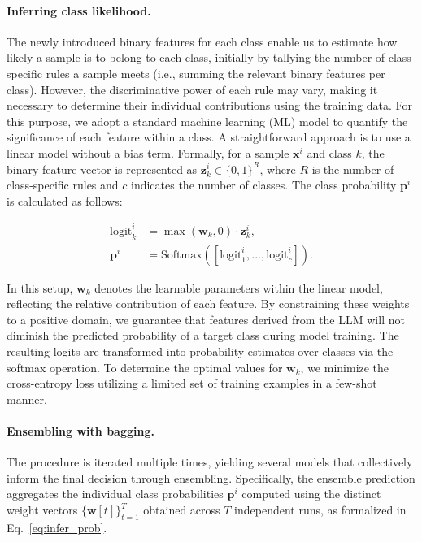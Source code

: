 \paragraph{Inferring class likelihood.} The newly introduced binary features for each class enable us to estimate how likely a sample is to belong to each class, initially by tallying the number of class-specific rules a sample meets (i.e., summing the relevant binary features per class). However, the discriminative power of each rule may vary, making it necessary to determine their individual contributions using the training data. For this purpose, we adopt a standard machine learning (ML) model to quantify the significance of each feature within a class. A straightforward approach is to use a linear model without a bias term. Formally, for a sample $\mathbf{x}^i$ and class $k$, the binary feature vector is represented as $\mathbf{z}_k^i \in \{0, 1\}^R$, where $R$ is the number of class-specific rules and $c$ indicates the number of classes. The class probability $\mathbf{p}^i$ is calculated as follows:

\begin{align}
\text{logit}_k^i &= \max(\mathbf{w}_k, 0) \cdot \mathbf{z}_k^i, \nonumber \\
\mathbf{p}^i &= \text{Softmax}({[\text{logit}_{1}^i, ..., \text{logit}_{c}^i]}). \label{eq:infer_prob}
\end{align}

In this setup, $\mathbf{w}_k$ denotes the learnable parameters within the linear model, reflecting the relative contribution of each feature. By constraining these weights to a positive domain, we guarantee that features derived from the LLM will not diminish the predicted probability of a target class during model training. The resulting logits are transformed into probability estimates over classes via the softmax operation. To determine the optimal values for $\mathbf{w}_k$, we minimize the cross-entropy loss utilizing a limited set of training examples in a few-shot manner.

\vspace*{-0.12in}
\paragraph{Ensembling with bagging.} The procedure is iterated multiple times, yielding several models that collectively inform the final decision through ensembling. Specifically, the ensemble prediction aggregates the individual class probabilities $\mathbf{p}^i$ computed using the distinct weight vectors $\{\mathbf{w}[t]\}_{t=1}^T$ obtained across $T$ independent runs, as formalized in Eq.~\ref{eq:infer_prob}.

